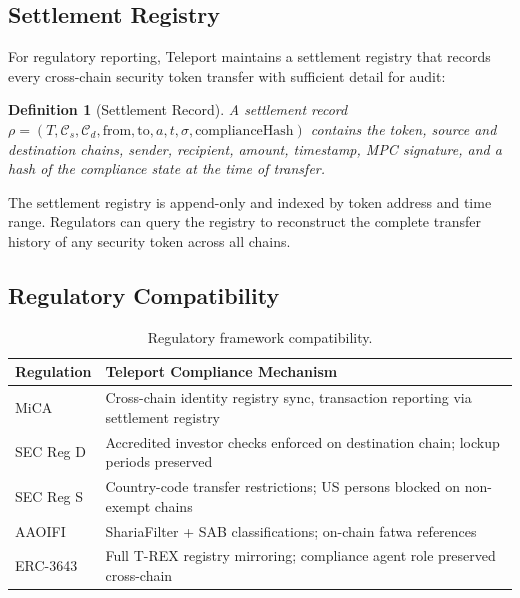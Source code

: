 \documentclass[11pt,twocolumn]{article}
\newtheorem{definition}[theorem]{Definition}
\theoremstyle{definition}
\newcommand{\Chain}{\mathcal{C}}
\begin{document}
\subsection{Settlement Registry}

For regulatory reporting, Teleport maintains a settlement registry that records every cross-chain security token transfer with sufficient detail for audit:

\begin{definition}[Settlement Record]
\label{def:settlement}
A settlement record $\rho = (T, \Chain_s, \Chain_d, \text{from}, \text{to}, a, t, \sigma, \text{complianceHash})$ contains the token, source and destination chains, sender, recipient, amount, timestamp, MPC signature, and a hash of the compliance state at the time of transfer.
\end{definition}

The settlement registry is append-only and indexed by token address and time range. Regulators can query the registry to reconstruct the complete transfer history of any security token across all chains.

\subsection{Regulatory Compatibility}

\begin{table}[h]
\centering
\small
\begin{tabular}{@{}p{2cm}p{4.8cm}@{}}
\toprule
\textbf{Regulation} & \textbf{Teleport Compliance Mechanism} \\
\midrule
MiCA~\cite{mica2023} & Cross-chain identity registry sync, transaction reporting via settlement registry \\
\addlinespace
SEC Reg D & Accredited investor checks enforced on destination chain; lockup periods preserved \\
\addlinespace
SEC Reg S & Country-code transfer restrictions; US persons blocked on non-exempt chains \\
\addlinespace
AAOIFI & ShariaFilter + SAB classifications; on-chain fatwa references \\
\addlinespace
ERC-3643 & Full T-REX registry mirroring; compliance agent role preserved cross-chain \\
\bottomrule
\end{tabular}
\caption{Regulatory framework compatibility.}
\label{tab:regulatory}
\end{table}
\end{document}
